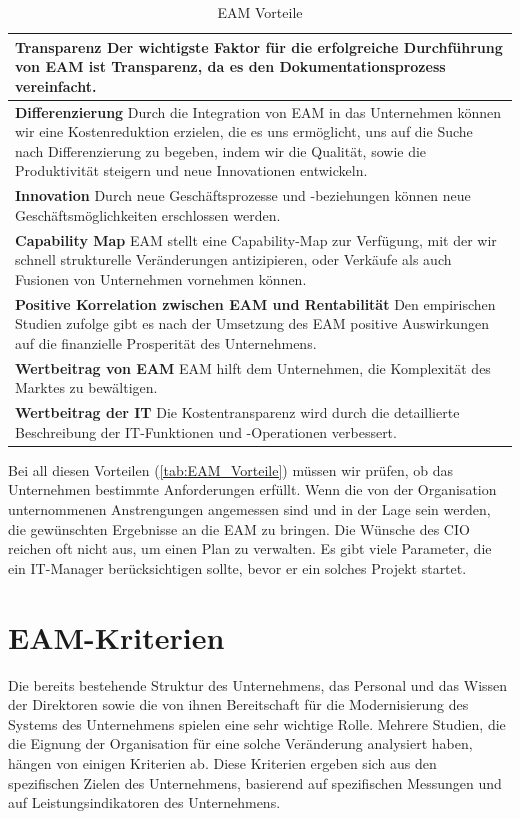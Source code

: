 \documentclass[
	A4paper,
	DIV=9,
	BCOR7mm,
	smallheadings,
	headinclude,
	footinclude,
	headsepline,
	parindent,
	german,
	captions=tableheading,
	abstracton
	]{scrreprt}
\begin{document}
\begin{table}[!htbp]
\caption{EAM Vorteile}
\begin{center}
\begin{tabularx}{\textwidth}{|X|}
\hline
\textbf{Transparenz} Der wichtigste Faktor für die erfolgreiche Durchführung von EAM ist Transparenz, da es den Dokumentationsprozess vereinfacht.
\\\hline
\textbf{Differenzierung} Durch die Integration von EAM in das Unternehmen können wir eine Kostenreduktion erzielen, die es uns ermöglicht, uns auf die Suche nach Differenzierung zu begeben, indem wir die Qualität, sowie die Produktivität steigern und neue Innovationen entwickeln.
\\\hline
\textbf{Innovation} Durch neue Geschäftsprozesse und  -beziehungen können neue Geschäftsmöglichkeiten erschlossen werden.
\\\hline
\textbf{Capability Map} EAM stellt eine Capability-Map zur Verfügung, mit der wir schnell strukturelle Veränderungen antizipieren, oder Verkäufe als auch Fusionen von Unternehmen vornehmen können.
\\\hline
\textbf{Positive Korrelation zwischen EAM und Rentabilität} Den empirischen Studien zufolge gibt es nach der Umsetzung des EAM positive Auswirkungen auf die finanzielle Prosperität des Unternehmens.
\\\hline
\textbf{Wertbeitrag von EAM} EAM hilft dem Unternehmen, die Komplexität des Marktes zu bewältigen.
\\\hline
\textbf{Wertbeitrag der IT} Die Kostentransparenz wird durch die detaillierte Beschreibung der IT-Funktionen und -Operationen verbessert.
\\\hline
\end{tabularx}
\end{center}
\label{tab:EAM_Vorteile}
\end{table}%

Bei all diesen Vorteilen (\autoref{tab:EAM_Vorteile}) müssen wir prüfen, ob das Unternehmen bestimmte Anforderungen erfüllt. Wenn die von der Organisation unternommenen Anstrengungen angemessen sind und in der Lage sein werden, die gewünschten Ergebnisse an die EAM zu bringen. Die Wünsche des CIO reichen oft nicht aus, um einen Plan zu verwalten. Es gibt viele Parameter, die ein IT-Manager berücksichtigen sollte, bevor er ein solches Projekt startet.

\section{EAM-Kriterien}
Die bereits bestehende Struktur des Unternehmens, das Personal und das Wissen der Direktoren sowie die von ihnen Bereitschaft für die Modernisierung des Systems des Unternehmens spielen eine sehr wichtige Rolle. Mehrere Studien, die die Eignung der Organisation für eine solche Veränderung analysiert haben, hängen von einigen Kriterien ab. Diese Kriterien ergeben sich aus den spezifischen Zielen des Unternehmens, basierend auf spezifischen Messungen und auf Leistungsindikatoren des Unternehmens.
\end{document}
